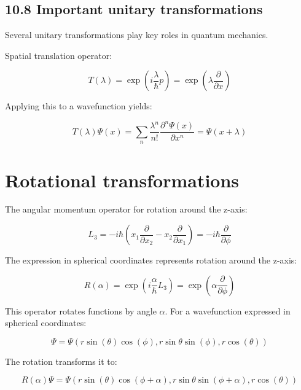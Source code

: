 \documentclass[10pt]{article}
\begin{document}
\subsection*{10.8 Important unitary transformations}
Several unitary transformations play key roles in quantum mechanics.

Spatial translation operator:

\begin{equation*}
T(\lambda)=\exp \left(i \frac{\lambda}{\hbar} p\right)=\exp \left(\lambda \frac{\partial}{\partial x}\right) \tag{10.47}
\end{equation*}

Applying this to a wavefunction yields:

\begin{equation*}
T(\lambda) \Psi(x)=\sum_{n} \frac{\lambda^{n}}{n!} \frac{\partial^{n} \Psi(x)}{\partial x^{n}}=\Psi(x+\lambda) \tag{10.48}
\end{equation*}

\section*{Rotational transformations}

The angular momentum operator for rotation around the z-axis:

\begin{equation*}
L_{3}=-i \hbar\left(x_{1} \frac{\partial}{\partial x_{2}}-x_{2} \frac{\partial}{\partial x_{1}}\right)=-i \hbar \frac{\partial}{\partial \phi} \tag{10.49}
\end{equation*}


The expression in spherical coordinates represents rotation around the z-axis:

\begin{equation*}
R(\alpha)=\exp \left(i \frac{\alpha}{\hbar} L_{3}\right)=\exp \left(\alpha \frac{\partial}{\partial \phi}\right) \tag{10.50}
\end{equation*}

This operator rotates functions by angle $\alpha$. For a wavefunction expressed in spherical coordinates:

\begin{equation*}
\Psi=\Psi(r \sin (\theta) \cos (\phi), r \sin \theta \sin (\phi), r \cos (\theta)) \tag{10.51}
\end{equation*}

The rotation transforms it to:

\begin{equation*}
R(\alpha) \Psi=\Psi(r \sin (\theta) \cos (\phi+\alpha), r \sin \theta \sin (\phi+\alpha), r \cos (\theta)) \tag{10.52}
\end{equation*}
\end{document}
